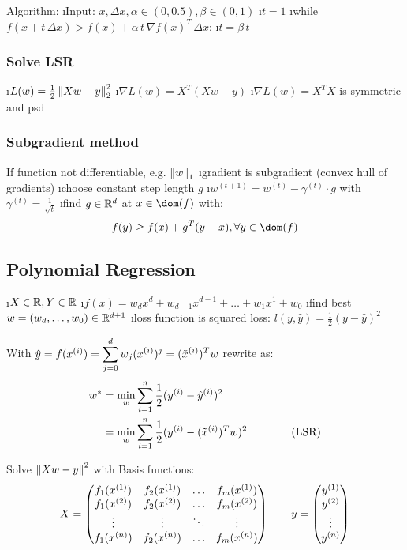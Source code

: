 Algorithm:
\be
\i Input: $x, \Delta x, \alpha \in (0,0.5), \beta \in (0,1)$
\i $t = 1$
\i while $f(x + t \, \Delta x) > f(x) + \alpha \, t \, \nabla f(x)^T \, \Delta x$:
\i \quad $t = \beta \, t$
\ee

\subsubsection{Solve LSR}

\be
\i $L(w) = \frac{1}{2} \left\lVert Xw-y\right\rVert_2^2$
\i $\nabla L(w) = X^T(Xw-y)$
\i $\nabla L(w) = X^TX$ is symmetric and psd
\ee

\subsubsection{Subgradient method} %

If function not differentiable, e.g. $\left\lVert w\right\rVert_1$
\bi
\i gradient is subgradient (convex hull of gradients)
\i choose constant step length $g$
\i $w^{(t+1)} = w^{(t)} - \gamma^{(t)} \cdot g$ with $\gamma^{(t)} = \frac{1}{\sqrt{t}}$
\i find $g \in \mathbb{R}^d$ at $x \in \dom(f)$ with: \[f(y) \geq f(x) + g^T(y-x), \forall y \in \dom(f)\]
\ei

\subsection{Polynomial Regression}

\bi
\i $X \in \mathbb{R}, Y \in \mathbb{R}$
\i $f(x) = w_dx^d + w_{d-1}x^{d-1} + \ldots + w_1x^1 + w_0$
\i find best $w = (w_d, \ldots, w_0) \in \mathbb{R}^{d+1}$
\i loss function is squared loss: $l(y, \hat y) = \frac{1}{2}(y - \hat y)^2$
\ei

\begin{samepage}
With $\hat y = f(x^{(i)}) = \displaystyle\sum^d_{j=0}w_j (x^{(i)})^j = (\tilde x ^{(i)})^T w$ rewrite as:
\begin{align*}
  w^* &= \min_w \displaystyle\sum^n_{i=1}\frac{1}{2}(y^{(i)} - \hat y^{(i)})^2\\
  &= \min_w \displaystyle\sum^n_{i=1}\frac{1}{2}(y^{(i)} - (\tilde x ^{(i)})^T w)^2 \text{\qquad\qquad (LSR)}
\end{align*}
\end{samepage}

Solve $\left\lVert Xw-y\right\rVert^2$ with Basis functions:
\[
X = \begin{pmatrix} f_1(x^{(1)}) & f_2(x^{(1)}) & \ldots & f_m(x^{(1)})\\
f_1(x^{(2)}) & f_2(x^{(2)}) & \ldots & f_m(x^{(2)})\\
\vdots & \vdots & \ddots & \vdots\\
f_1(x^{(n)}) & f_2(x^{(n)}) & \ldots & f_m(x^{(n)}) \end{pmatrix} \qquad y = \begin{pmatrix} y^{(1)}\\y^{(2)}\\\vdots\\y^{(n)} \end{pmatrix}
\]

